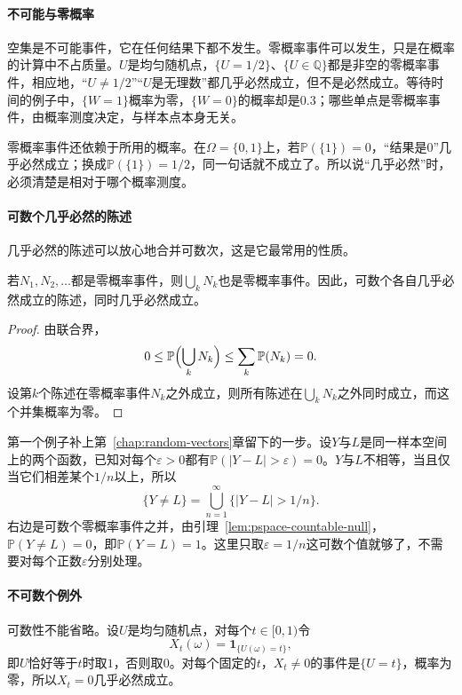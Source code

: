 \paragraph{不可能与零概率}
空集是不可能事件，它在任何结果下都不发生。零概率事件可以发生，只是在概率的计算中不占质量。$U$是均匀随机点，$\{U=1/2\}$、$\{U\in\mathbb{Q}\}$都是非空的零概率事件，相应地，“$U\neq1/2$”“$U$是无理数”都几乎必然成立，但不是必然成立。等待时间的例子中，$\{W=1\}$概率为零，$\{W=0\}$的概率却是$0.3$；哪些单点是零概率事件，由概率测度决定，与样本点本身无关。

零概率事件还依赖于所用的概率。在$\Omega=\{0,1\}$上，若$\mathbb{P}(\{1\})=0$，“结果是$0$”几乎必然成立；换成$\mathbb{P}(\{1\})=1/2$，同一句话就不成立了。所以说“几乎必然”时，必须清楚是相对于哪个概率测度。

\paragraph{可数个几乎必然的陈述}
几乎必然的陈述可以放心地合并可数次，这是它最常用的性质。

\begin{lemma}[可数个零概率事件之并]
\label{lem:pspace-countable-null}
若$N_1,N_2,\dots$都是零概率事件，则$\bigcup_kN_k$也是零概率事件。因此，可数个各自几乎必然成立的陈述，同时几乎必然成立。
\end{lemma}

\begin{proof}
由联合界，
\[
  0\leq\mathbb{P}\Bigl(\bigcup_{k}N_k\Bigr)\leq\sum_{k}\mathbb{P}(N_k)=0 .
\]
设第$k$个陈述在零概率事件$N_k$之外成立，则所有陈述在$\bigcup_kN_k$之外同时成立，而这个并集概率为零。
\end{proof}

第一个例子补上第~\ref{chap:random-vectors}章留下的一步。设$Y$与$L$是同一样本空间上的两个函数，已知对每个$\varepsilon>0$都有$\mathbb{P}(\lvert Y-L\rvert>\varepsilon)=0$。$Y$与$L$不相等，当且仅当它们相差某个$1/n$以上，所以
\[
  \{Y\neq L\}=\bigcup_{n=1}^{\infty}\bigl\{\lvert Y-L\rvert>1/n\bigr\}.
\]
右边是可数个零概率事件之并，由引理~\ref{lem:pspace-countable-null}，$\mathbb{P}(Y\neq L)=0$，即$\mathbb{P}(Y=L)=1$。这里只取$\varepsilon=1/n$这可数个值就够了，不需要对每个正数$\varepsilon$分别处理。

\paragraph{不可数个例外}
可数性不能省略。设$U$是均匀随机点，对每个$t\in[0,1)$令
\[
  X_t(\omega)=\mathbf{1}_{\{U(\omega)=t\}},
\]
即$U$恰好等于$t$时取$1$，否则取$0$。对每个固定的$t$，$X_t\neq0$的事件是$\{U=t\}$，概率为零，所以$X_t=0$几乎必然成立。

